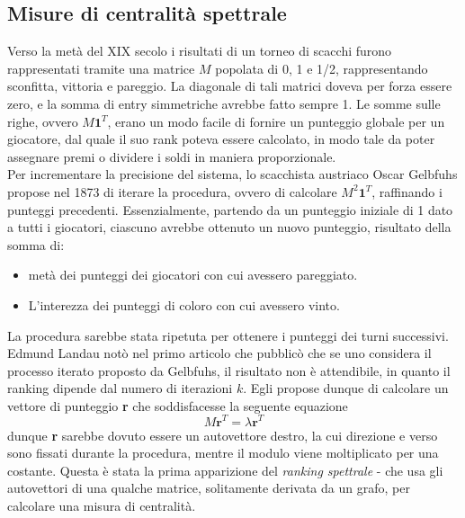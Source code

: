 \subsection{Misure di centralità spettrale}
Verso la metà del XIX secolo i risultati di un torneo di scacchi furono rappresentati tramite una matrice $M$ popolata di 0, 1 e 1/2, rappresentando sconfitta, vittoria e pareggio. La diagonale di tali matrici doveva per forza essere zero, e la somma di entry simmetriche avrebbe fatto sempre 1. Le somme sulle righe, ovvero $M\textbf{1}^T$, erano un modo facile di fornire un punteggio globale per un giocatore, dal quale il suo rank poteva essere calcolato, in modo tale da poter assegnare premi o dividere i soldi in maniera proporzionale.\\
Per incrementare la precisione del sistema, lo scacchista austriaco Oscar Gelbfuhs propose nel 1873 di iterare la procedura, ovvero di calcolare $M^2\textbf{1}^T$, raffinando i punteggi precedenti. Essenzialmente, partendo da un punteggio iniziale di 1 dato a tutti i giocatori, ciascuno avrebbe ottenuto un nuovo punteggio, risultato della somma di:
\begin{itemize}
    \item metà dei punteggi dei giocatori con cui avessero pareggiato.
    \item L'interezza dei punteggi di coloro con cui avessero vinto.
\end{itemize}
La procedura sarebbe stata ripetuta per ottenere i punteggi dei turni successivi.\\
Edmund Landau %
notò nel primo articolo che pubblicò %
che se uno considera il processo iterato proposto da Gelbfuhs, il risultato non è attendibile, in quanto il ranking dipende dal numero di iterazioni $k$. Egli propose dunque di calcolare un vettore di punteggio \textbf{r} che soddisfacesse la seguente equazione
\begin{equation}
    M\textbf{r}^T = \lambda \textbf{r}^T
\end{equation}
dunque \textbf{r} sarebbe dovuto essere un autovettore destro, la cui direzione e verso sono fissati durante la procedura, mentre il modulo viene moltiplicato per una costante. Questa è stata la prima apparizione del \textit{ranking spettrale} - che usa gli autovettori di una qualche matrice, solitamente derivata da un grafo, per calcolare una misura di centralità.
